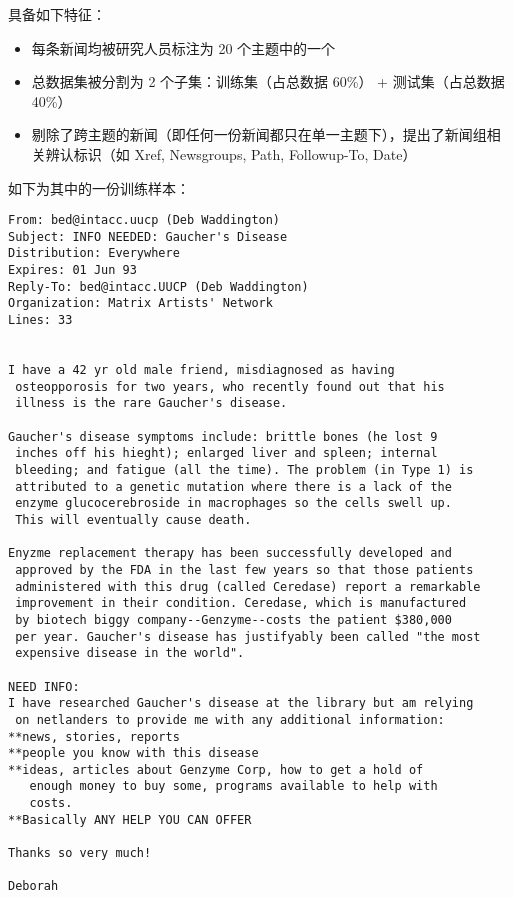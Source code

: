\documentclass[11pt]{article}
\providecommand{\tightlist}{%
      \setlength{\itemsep}{0pt}\setlength{\parskip}{0pt}}
\begin{document}
具备如下特征：

\begin{itemize}
\tightlist
\item
  每条新闻均被研究人员标注为 20 个主题中的一个
\item
  总数据集被分割为 2 个子集：训练集（占总数据 60\%） + 测试集（占总数据
  40\%）
\item
  剔除了跨主题的新闻（即任何一份新闻都只在单一主题下），提出了新闻组相关辨认标识（如
  Xref, Newsgroups, Path, Followup-To, Date）
\end{itemize}

如下为其中的一份训练样本：

\begin{verbatim}
From: bed@intacc.uucp (Deb Waddington)
Subject: INFO NEEDED: Gaucher's Disease
Distribution: Everywhere
Expires: 01 Jun 93
Reply-To: bed@intacc.UUCP (Deb Waddington)
Organization: Matrix Artists' Network
Lines: 33


I have a 42 yr old male friend, misdiagnosed as having
 osteopporosis for two years, who recently found out that his
 illness is the rare Gaucher's disease. 

Gaucher's disease symptoms include: brittle bones (he lost 9 
 inches off his hieght); enlarged liver and spleen; internal
 bleeding; and fatigue (all the time). The problem (in Type 1) is
 attributed to a genetic mutation where there is a lack of the
 enzyme glucocerebroside in macrophages so the cells swell up.
 This will eventually cause death.

Enyzme replacement therapy has been successfully developed and
 approved by the FDA in the last few years so that those patients
 administered with this drug (called Ceredase) report a remarkable
 improvement in their condition. Ceredase, which is manufactured
 by biotech biggy company--Genzyme--costs the patient $380,000
 per year. Gaucher's disease has justifyably been called "the most
 expensive disease in the world".

NEED INFO:
I have researched Gaucher's disease at the library but am relying
 on netlanders to provide me with any additional information:
**news, stories, reports
**people you know with this disease
**ideas, articles about Genzyme Corp, how to get a hold of
   enough money to buy some, programs available to help with
   costs.
**Basically ANY HELP YOU CAN OFFER

Thanks so very much!

Deborah 
\end{verbatim}
\end{document}
